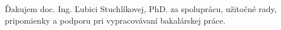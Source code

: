 Ďakujem doc. Ing. Ľubici Stuchlíkovej, PhD. za spoluprácu, užitočné rady, pripomienky a podporu pri vypracovávaní bakalárskej práce.